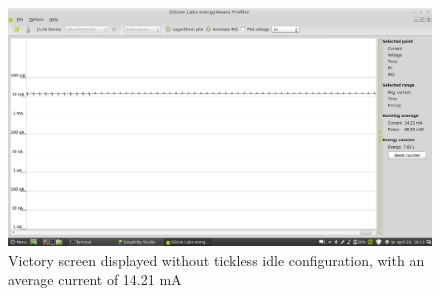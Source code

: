 \begin{figure}[H]
  \centering
  \includegraphics[clip, trim=0cm 0cm 0cm 0cm, width=12cm]{fig/victoryscreen-idle.png}
  \caption{Victory screen displayed without tickless idle configuration, with an average current of 14.21 mA}
\end{figure}
